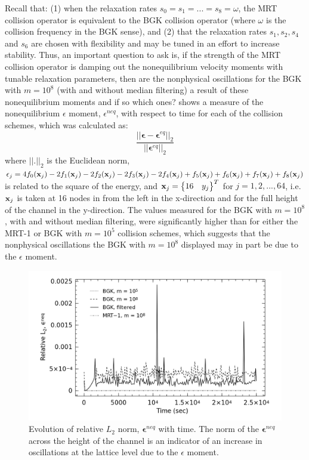 Recall that: (1) when the relaxation rates $s_0 = s_1 = ... = s_8 = \omega$, the MRT collision operator is equivalent to the BGK collision operator (where $\omega$ is the collision frequency in the BGK sense), and (2) that the relaxation rates $s_1, s_2, s_4$ and $s_6$ are chosen with flexibility and may be tuned in an effort to increase stability.
Thus, an important question to ask is, if the strength of the MRT collision operator is damping out the nonequilibrium velocity moments with tunable relaxation parameters, then are the nonphysical oscillations for the BGK with $m = 10^8$ (with and without median filtering) a result of these nonequilibrium moments and if so which ones?
 shows a measure of the nonequilibrium $\epsilon$ moment, $\epsilon^{neq}$, with respect to time for each of the collision schemes, which was calculated as:
\begin{equation}
\frac{||\boldsymbol{\epsilon} - \boldsymbol{\epsilon}^{eq}||_2}{||\boldsymbol{\epsilon}^{eq}||_2}
\end{equation}
\noindent where $||.||_2$ is the Euclidean norm, $\epsilon_j = 4f_0(\mathbf{x}_j) - 2f_1(\mathbf{x}_j) - 2f_2(\mathbf{x}_j) - 2f_3(\mathbf{x}_j) - 2f_4(\mathbf{x}_j) + f_5(\mathbf{x}_j) + f_6(\mathbf{x}_j) + f_7(\mathbf{x}_j) + f_8(\mathbf{x}_j)$ is related to the square of the energy, and $\mathbf{x}_j = \begin{Bmatrix}16 & y_j\end{Bmatrix}^T$ for $j = 1, 2, ..., 64$, i.e. $\mathbf{x}_j$ is taken at 16 nodes in from the left in the x-direction and for the full height of the channel in the y-direction.
The values measured for the BGK with $m = 10^8$, with and without median filtering, were significantly higher than for either the MRT-1 or BGK with $m = 10^5$ collision schemes, which suggests that the nonphysical oscillations the BGK with $m = 10^8$ displayed may in part be due to the $\epsilon$ moment.

\begin{figure}
	\centering
    \includegraphics[width=\linewidth]{figs/poise-bingham/epsilon}
    \caption{Evolution of relative $L_2$ norm, $\boldsymbol{\epsilon}^{neq}$ with time. The norm of the $\boldsymbol{\epsilon}^{neq}$ across the height of the channel is an indicator of an increase in oscillations at the lattice level due to the $\epsilon$ moment.}
    \label{fig:epsilon}
\end{figure}


